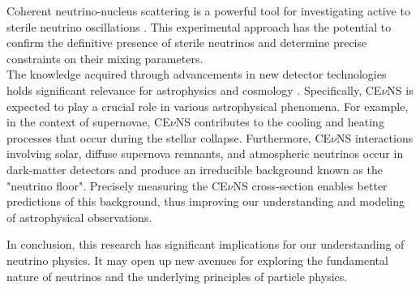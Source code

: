 Coherent neutrino-nucleus scattering is a powerful tool for investigating active to sterile neutrino oscillations \cite{Anderson_2012}. This experimental approach has the potential to confirm the definitive presence of sterile neutrinos and determine precise constraints on their mixing parameters. \\
The knowledge acquired through advancements in new detector technologies holds significant relevance for astrophysics and cosmology \cite{Drukier}. Specifically,  CE$\nu$NS is expected to play a crucial role in various astrophysical phenomena. For example, in the context of supernovae, CE$\nu$NS contributes to the cooling and heating processes that occur during the stellar collapse. Furthermore, CE$\nu$NS interactions involving solar, diffuse supernova remnants, and atmospheric neutrinos occur in dark-matter detectors and produce an irreducible background known as the "neutrino floor". Precisely measuring the CE$\nu$NS cross-section enables better predictions of this background, thus improving our understanding and modeling of astrophysical observations. 

In conclusion, this research has significant implications for our understanding of neutrino physics. It may open up new avenues for exploring the fundamental nature of neutrinos and the underlying principles of particle physics.



